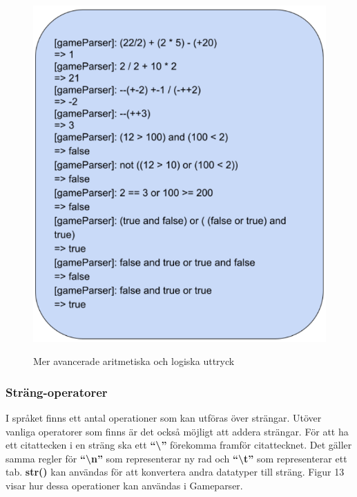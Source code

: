 \documentclass{Dokumentmall}
\begin{document}
\begin{figure}[h!]
  \centering
  \includegraphics[scale = 0.65]{Images/Figur12.png}
  \label{}
  \caption{Mer avancerade aritmetiska och logiska uttryck}
\end{figure}

\newpage
\subsubsection{Sträng-operatorer}
I språket finns ett antal operationer som kan utföras över strängar.
Utöver vanliga operatorer som finns är det också möjligt att addera strängar. För att ha ett citattecken i en sträng ska ett \textbf{``\textbackslash''} förekomma framför citattecknet. Det gäller samma regler för \textbf{``\textbackslash n''} som representerar ny rad och \textbf{``\textbackslash t''} som representerar ett tab. \textbf{str()} kan användas för att konvertera andra datatyper till sträng. Figur 13 visar hur dessa operationer kan användas i Gameparser.
\end{document}
